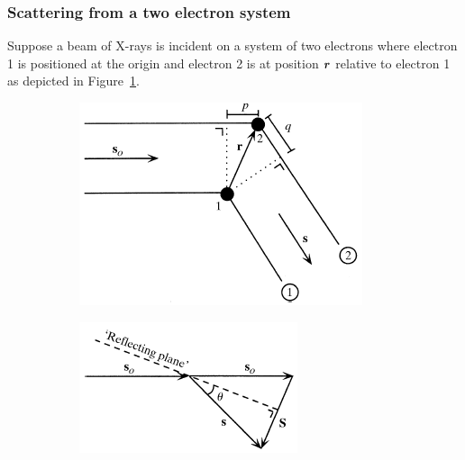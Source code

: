         \subsubsection{Scattering from a two electron system}
        \label{subs:Scattering from two electron system}
            Suppose a beam of X-rays is incident on a system of two electrons where electron 1 is positioned at the origin and electron 2 is at position $\boldsymbol{r}$ relative to electron 1 as depicted in Figure~\ref{fig:Two electron system}.
            \begin{figure}
                \centering
                \begin{subfigure}[b]{0.45\textwidth}
                        \centering
                        \includegraphics[width=\textwidth]{figures/introduction/twoelectronsystem.png}
                        \caption{}
                        \label{fig:Two electron system}
                \end{subfigure}
                \qquad
                \begin{subfigure}[b]{0.45\textwidth}
                        \centering
                        \includegraphics[width=\textwidth]{figures/introduction/scatteringvector.png}

\end{subfigure}
\end{figure}
